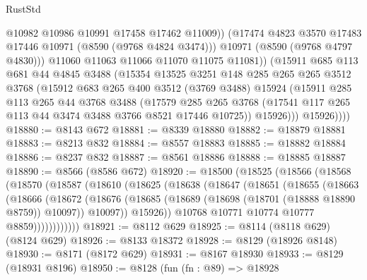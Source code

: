 \begin{lexlean}{RustStd}
\begin{coremodule}
                    @10982
                    @10986
                    @10991
                    @17458
                    @17462
                    @11009))
                (@17474 @4823 @3570 @17483 @17446 @10971 (@8590 (@9768 @4824 @3474)))
                @10971
                (@8590 (@9768 @4797 @4830)))
              @11060
              @11063
              @11066
              @11070
              @11075
              @11081))
          (@15911
            @685
            @113
            @681
            @44
            @4845
            @3488
            (@15354
              @13525
              @3251
              @148
              @285
              @265
              @265
              @3512
              @3768
              (@15912
                @683
                @265
                @400
                @3512
                (@3769 @3488)
                @15924
                (@15911
                  @285
                  @113
                  @265
                  @44
                  @3768
                  @3488
                  (@17579
                    @285
                    @265
                    @3768
                    (@17541 @117 @265 @113 @44 @3474 @3488 @3766 @8521 @17446 @10725))
                  @15926)))
            @15926))))
@18880 := @8143 @672
@18881 := @8339 @18880
@18882 := @18879 @18881
@18883 := @8213 @832
@18884 := @8557 @18883
@18885 := @18882 @18884
@18886 := @8237 @832
@18887 := @8561 @18886
@18888 := @18885 @18887
@18890 := @8566 (@8586 @672)
@18920 := @18500
    (@18525
      (@18566
        (@18568
          (@18570
            (@18587
              (@18610
                (@18625
                  (@18638
                    (@18647
                      (@18651
                        (@18655
                          (@18663
                            (@18666
                              (@18672
                                (@18676
                                  (@18685
                                    (@18689 (@18698 (@18701 (@18888 @18890 @8759)) @10097))
                                    @10097))
                                @15926))
                            @10768
                            @10771
                            @10774
                            @10777
                            @8859))))))))))))
@18921 := @8112 @629
@18925 := @8114 (@8118 @629) (@8124 @629)
@18926 := @8133 @18372
@18928 := @8129 (@18926 @8148)
@18930 := @8171 (@8172 @629)
@18931 := @8167 @18930
@18933 := @8129 (@18931 @8196)
@18950 := @8128
    (fun (fn : @89) =>
    @18928

\end{coremodule}
\end{lexlean}
